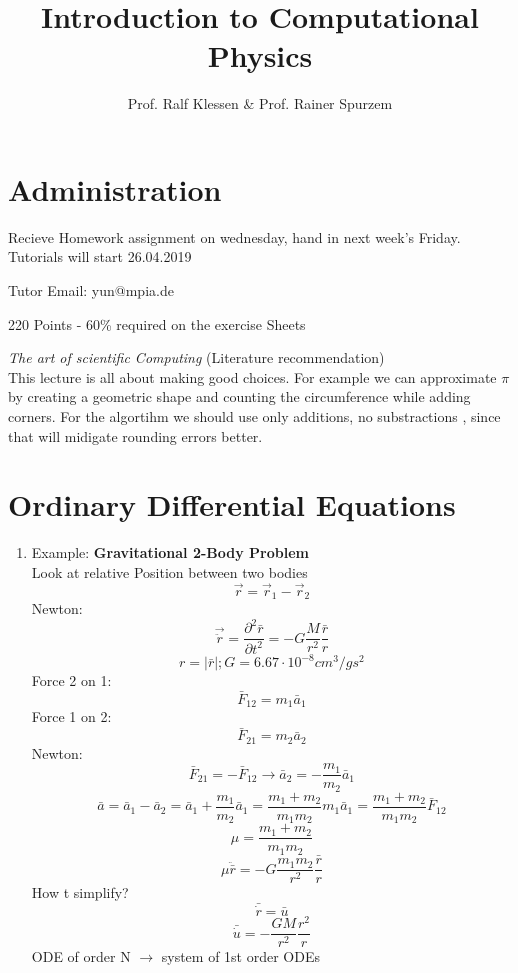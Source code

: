 \documentclass{article}
\title{Introduction to Computational Physics}
\author{Prof. Ralf Klessen \& Prof. Rainer Spurzem}
\begin{document}
\maketitle
\newpage

\section{Administration}

Recieve Homework assignment on wednesday, hand in next week's Friday.
Tutorials will start 26.04.2019

Tutor Email: yun@mpia.de

220 Points - 60\% required on the exercise Sheets

\textit{The art of scientific Computing} (Literature recommendation) \\

This lecture is all about making good choices. For example we can approximate
\( \pi \) by creating a geometric shape and counting the circumference while
adding corners. For the algortihm we should use only additions, no substractions
, since that will midigate rounding errors better. 

\section*{Ordinary Differential Equations} 
\begin{enumerate}
    \item Example: \textbf{Gravitational 2-Body Problem}\\
	Look at relative Position between two bodies
	\[ 
	    \vec r = \vec r_1 - \vec r_2
	\]
	Newton:
	\[ 
	    \vec \ddot r = \frac{\partial ^2 \bar r}{\partial t ^2} =
	    -G \frac{M}{r^2} \frac{\bar r}{r}
	\]
	\[ 
	    r = | \bar r | ; G = 6.67 \cdot 10^{-8} \si{cm^3/gs^2} 
	\]
	Force 2 on 1:
	\[ 
	    \bar F _{12} = m _{1} \bar a _{1}
	\]
	Force 1 on 2:
	\[ 
	    \bar F _{21} = m _{2} \bar a _{2} 
	\]
	Newton:
	\[ 
	    \bar F _{21} = - \bar F _{12} 
	\rightarrow \bar a _2 = - \frac{m_1}{m_2} \bar a_1
	\]
	\[ 
	    \bar a = \bar a_1 - \bar a_2 = \bar a_1 + \frac{m_1}{m_2} \bar a_1
	    = \frac{m_1 + m _2}{m_1 m_2} m_1 \bar a_1 = \frac{m_1 + m _2}{m_1 m_2}
	    \bar F_{12}
	\]
	\[ 
	    \mu = \frac{m_1 + m _2}{m_1 m_2}
	\]
	\[ 
	    \mu  \ddot \bar r = -G \frac{m_1 m_2}{r^2} \frac{\bar r}{r}
	\]
	How t simplify?
	\[ 
	    \bar \dot r = \bar u
	\]
	\[ 
	    \bar \dot u = - \frac{GM}{r^2} \frac{r^2}{r}
	\]
	ODE of order N \( \rightarrow \) system of 1st order ODEs
	
	
	

\end{enumerate}
\end{document}

